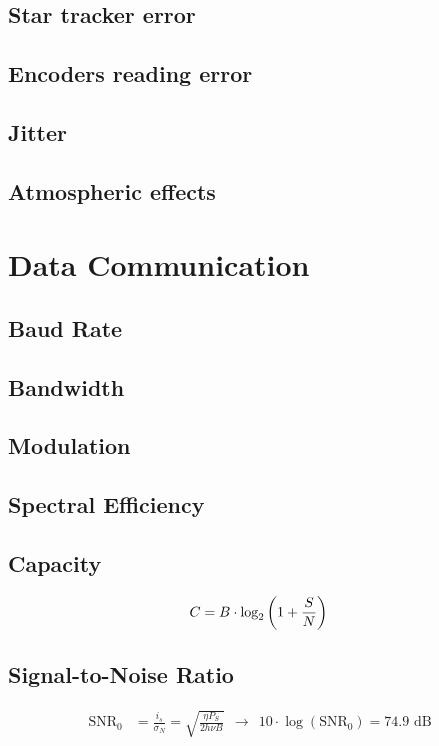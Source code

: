 \documentclass[a4paper]{article}
\begin{document}
\subsection{Star tracker error}
\subsection{Encoders reading error}
\subsection{Jitter}
\subsection{Atmospheric effects}

\section{Data Communication}
\subsection{Baud Rate}
\subsection{Bandwidth}
\subsection{Modulation}
\subsection{Spectral Efficiency}
\subsection{Capacity}
\begin{equation*}
C = B\cdot \textrm{log}_2\left(1+\frac{S}{N}\right) \\
\end{equation*}
\subsection{Signal-to-Noise Ratio}
\begin{align*}
\textrm{SNR}_0 &= \frac{i_s}{\sigma_N} = \sqrt{\frac{\eta P_S}{2h\nu B}} \ \ \rightarrow \ \ 10\cdot \log(\textrm{SNR}_0) = 74.9 \textrm{ dB}
\\
\\
\end{align*}
\end{document}
